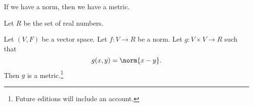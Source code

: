 

If we have a norm, then we
have a metric.


Let $R$ be the set of real
numbers.

\begin{prop}
Let $(V, F)$ be a vector space.
Let $f: V \to R$ be a norm.
Let $g: V \times V \to R$ such
that
\[
  g(x, y) = \norm{x - y}.
\]
  Then $g$ is a metric.\footnote{Future editions will include an account.}
\end{prop}

\blankpage
